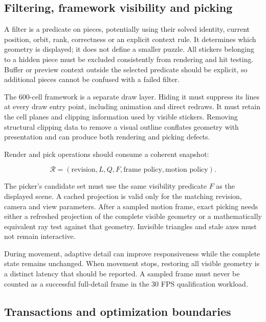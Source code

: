 \documentclass[
  10pt,
  a4paper,
]{article}
\begin{document}
\subsection{Filtering, framework visibility and
picking}\label{filtering-framework-visibility-and-picking}

A filter is a predicate on pieces, potentially using their solved
identity, current position, orbit, rank, correctness or an explicit
context rule. It determines which geometry is displayed; it does not
define a smaller puzzle. All stickers belonging to a hidden piece must
be excluded consistently from rendering and hit testing. Buffer or
preview context outside the selected predicate should be explicit, so
additional pieces cannot be confused with a failed filter.

The 600-cell framework is a separate draw layer. Hiding it must suppress
its lines at every draw entry point, including animation and direct
redraws. It must retain the cell planes and clipping information used by
visible stickers. Removing structural clipping data to remove a visual
outline conflates geometry with presentation and can produce both
rendering and picking defects.

Render and pick operations should consume a coherent snapshot:

\begin{equation}
\mathcal R=(\text{revision},L,Q,F,\text{frame policy},\text{motion policy}).
\end{equation}

The picker's candidate set must use the same visibility predicate \(F\)
as the displayed scene. A cached projection is valid only for the
matching revision, camera and view parameters. After a sampled motion
frame, exact picking needs either a refreshed projection of the complete
visible geometry or a mathematically equivalent ray test against that
geometry. Invisible triangles and stale axes must not remain
interactive.

During movement, adaptive detail can improve responsiveness while the
complete state remains unchanged. When movement stops, restoring all
visible geometry is a distinct latency that should be reported. A
sampled frame must never be counted as a successful full-detail frame in
the 30 FPS qualification workload.

\subsection{Transactions and optimization
boundaries}\label{transactions-and-optimization-boundaries}
\end{document}
